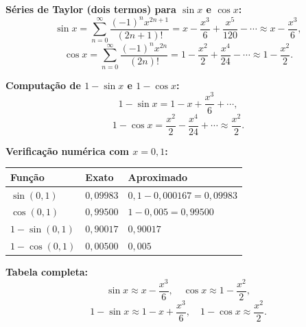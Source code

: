 \textbf{Séries de Taylor (dois termos) para $\sin x$ e $\cos x$:}
\[
\sin x = \sum_{n=0}^{\infty}\frac{(-1)^n x^{2n+1}}{(2n+1)!}
= x - \frac{x^3}{6} + \frac{x^5}{120} - \cdots \approx x - \frac{x^3}{6},
\]
\[
\cos x = \sum_{n=0}^{\infty}\frac{(-1)^n x^{2n}}{(2n)!}
= 1 - \frac{x^2}{2} + \frac{x^4}{24} - \cdots \approx 1 - \frac{x^2}{2}.
\]

\textbf{Computação de $1-\sin x$ e $1-\cos x$:}
\[
1-\sin x = 1 - x + \frac{x^3}{6} + \cdots,
\]
\[
1-\cos x = \frac{x^2}{2} - \frac{x^4}{24} + \cdots \approx \frac{x^2}{2}.
\]

\textbf{Verificação numérica com $x=0{,}1$:}
\begin{center}
\begin{tabular}{lll}
\hline
Função & Exato & Aproximado \\
\hline
$\sin(0{,}1)$ & $0{,}09983$ & $0{,}1-0{,}000167=0{,}09983$ \\
$\cos(0{,}1)$ & $0{,}99500$ & $1-0{,}005=0{,}99500$ \\
$1-\sin(0{,}1)$ & $0{,}90017$ & $0{,}90017$ \\
$1-\cos(0{,}1)$ & $0{,}00500$ & $0{,}005$ \\
\hline
\end{tabular}
\end{center}

\textbf{Tabela completa:}
\[
\sin x \approx x - \frac{x^{3}}{6},\quad
\cos x \approx 1 - \frac{x^{2}}{2},
\]
\[
1-\sin x \approx 1 - x + \frac{x^{3}}{6},\quad
1-\cos x \approx \frac{x^{2}}{2}.
\]